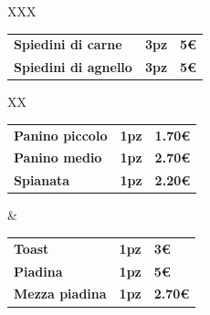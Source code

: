 \documentclass[hidelinks,10pt,a4paper]{article}
\newcommand{\mybox}[1]{
		\colorbox{square}{
		\begin{minipage}{0.97\linewidth}
			#1
		\end{minipage}
	}
}
\newcommand{\entryThreeSimple}[3]{
	{\textbf{\small{#1}}}&{\textbf{\small{#2}}}&{\textbf{\small{#3}}}\\
}
\begin{document}
\begin{landscape}
\begin{tabularx}{\linewidth}{XXX}
{{\begin{tabular*}{\linewidth}{ l l l }
				\entryThreeSimple{Spiedini di carne}{\hspace*{5mm}{\Large\chili}\hspace*{10.5mm}3pz}{\hspace*{9mm}5€}
				\entryThreeSimple{Spiedini di agnello}{\hspace*{5mm}{\Large\chili}\hspace*{10.5mm}3pz}{\hspace*{9mm}5€}
				\end{tabular*}
			}
			
				\mybox{
					\hspace*{-3mm}
				\begin{tabularx}{\linewidth}{XX}
					{
						\begin{tabular*}{\linewidth}{ l l l }
						\entryThreeSimple{Panino piccolo}{1pz}{1.70€}
						\entryThreeSimple{Panino medio}{1pz}{2.70€}
						\entryThreeSimple{Spianata}{1pz}{2.20€}
						\end{tabular*}
					}&{
						\begin{tabular*}{\linewidth}{ l l l }
							\entryThreeSimple{Toast}{1pz}{3€}
							\entryThreeSimple{Piadina}{1pz}{5€}
							\entryThreeSimple{Mezza piadina}{1pz}{2.70€}
						\end{tabular*}
					}
				\end{tabularx}
			}
			
}
\end{tabularx}
\end{landscape}
\end{document}
